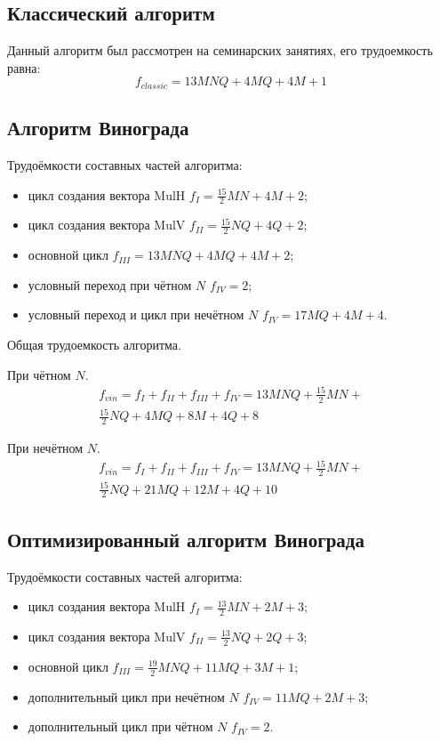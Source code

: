 \subsection{Классический алгоритм}
Данный алгоритм был рассмотрен на семинарских занятиях, его трудоемкость равна:
\begin{equation}
	\label{complex_classic}
	f_{classic} = 13MNQ + 4MQ + 4M + 1
\end{equation}

\subsection{Алгоритм Винограда}
Трудоёмкости составных частей алгоритма:
\begin{itemize}
	\item цикл создания вектора MulH $f_{I} = \frac{15}{2}MN + 4M + 2$;
	\item цикл создания вектора MulV  $f_{II} = \frac{15}{2}NQ + 4Q + 2$;
	\item основной цикл $f_{III} = 13MNQ + 4MQ + 4M + 2$;
	\item условный переход при чётном $N$ $f_{IV} = 2$;
	\item условный переход и цикл при нечётном $N$ $f_{IV} = 17MQ + 4M + 4$.
\end{itemize}

Общая трудоемкость алгоритма.

	При чётном $N$.
	\begin{equation}
		\label{vin_even}
		\begin{array}{cc}
			f_{vin} = f_{I} + f_{II} + f_{III} + f_{IV} = 13MNQ + \frac{15}{2}MN +\\ \frac{15}{2}NQ + 4MQ + 8M + 4Q + 8
		\end{array}
	\end{equation}

	При нечётном $N$.
	\begin{equation}
		\label{vin_odd}
		\begin{array}{cc}
			f_{vin} = f_{I} + f_{II} + f_{III} + f_{IV} = 13MNQ + \frac{15}{2}MN +\\ \frac{15}{2}NQ + 21MQ + 12M + 4Q + 10
		\end{array}
	\end{equation}

\subsection{Оптимизированный алгоритм Винограда}
Трудоёмкости составных частей алгоритма:
\begin{itemize}
	\item цикл создания вектора MulH $f_{I} = \frac{13}{2}MN + 2M + 3$;
	\item цикл создания вектора MulV  $f_{II} = \frac{13}{2}NQ + 2Q + 3$;
	\item основной цикл $f_{III} = \frac{19}{2}MNQ + 11MQ + 3M + 1$;
	\item дополнительный цикл при нечётном $N$ $f_{IV} = 11MQ + 2M + 3$;
	\item дополнительный цикл при чётном $N$ $f_{IV} = 2$.
\end{itemize}

